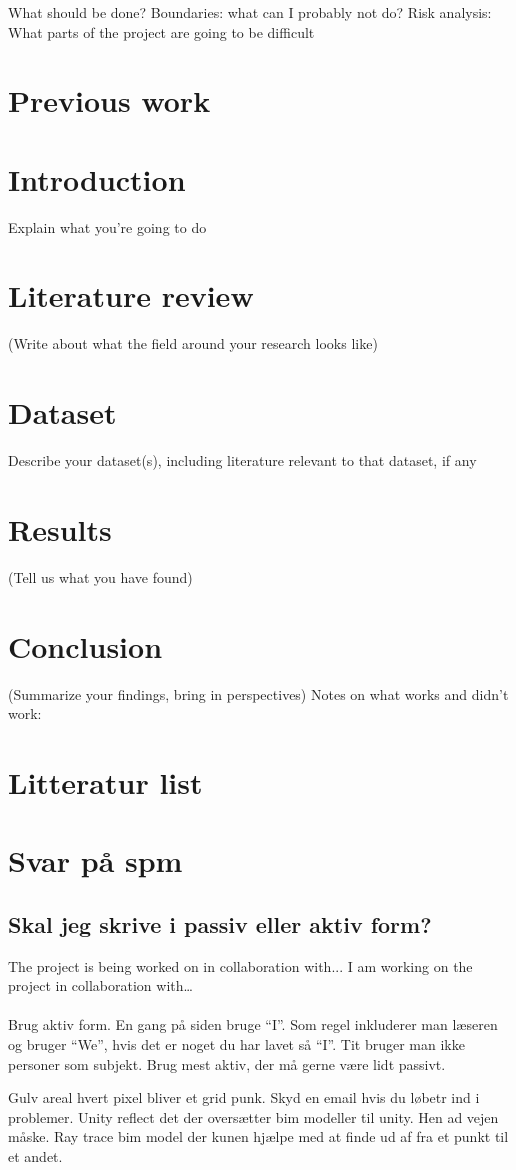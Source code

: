 What should be done?
Boundaries: what can I probably not do?
Risk analysis: What parts of the project are going to be difficult



\section*{Previous work}

\section*{Introduction}
Explain what you’re going to do

\section*{Literature review}
(Write about what the field around your research looks like)

\section*{Dataset}
Describe your dataset(s), including literature relevant to that dataset, if any

\section*{Results}
(Tell us what you have found)

\section*{Conclusion}
(Summarize your findings, bring in perspectives)
Notes on what works and didn’t work:

\section*{Litteratur list}


\section{Svar på spm}
\subsection{Skal jeg skrive i passiv eller aktiv form?}
The project is being worked on in collaboration with...
I am working on the project in collaboration with…
\\\\
Brug aktiv form. En gang på siden bruge “I”.
Som regel inkluderer man læseren og bruger “We”, hvis det er noget du har lavet så “I”.
Tit bruger man ikke personer som subjekt.
Brug mest aktiv, der må gerne være lidt passivt.


Gulv areal hvert pixel bliver et grid punk. Skyd en email hvis du løbetr ind i problemer.
Unity reflect det der oversætter bim modeller til unity. Hen ad vejen måske.
Ray trace bim model der kunen hjælpe med at finde ud af fra et punkt til et andet.


